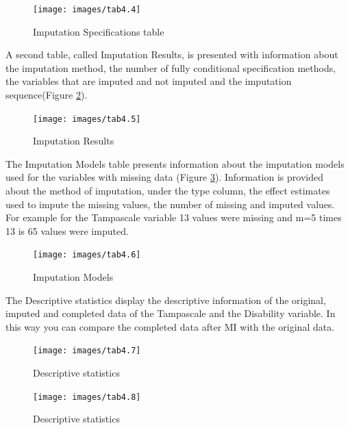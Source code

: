 \documentclass[
]{book}
\begin{document}
\begin{figure}

{\centering \texttt{[image: images/tab4.4]} 

}

\caption{Imputation Specifications table}\label{fig:tab4-4}
\end{figure}

A second table, called Imputation Results, is presented with information about the imputation method, the number of fully conditional specification methods, the variables that are imputed and not imputed and the imputation sequence(Figure \ref{fig:tab4-5}).

\begin{figure}

{\centering \texttt{[image: images/tab4.5]} 

}

\caption{Imputation Results}\label{fig:tab4-5}
\end{figure}

The Imputation Models table presents information about the imputation models used for the variables with missing data (Figure \ref{fig:tab4-6}). Information is provided about the method of imputation, under the type column, the effect estimates used to impute the missing values, the number of missing and imputed values. For example for the Tampascale variable 13 values were missing and m=5 times 13 is 65 values were imputed.

\begin{figure}

{\centering \texttt{[image: images/tab4.6]} 

}

\caption{Imputation Models}\label{fig:tab4-6}
\end{figure}

The Descriptive statistics display the descriptive information of the original, imputed and completed data of the Tampascale and the Disability variable. In this way you can compare the completed data after MI with the original data.

\begin{figure}

{\centering \texttt{[image: images/tab4.7]} 

}

\caption{Descriptive statistics}\label{fig:tab4-7-1}
\end{figure}
\begin{figure}

{\centering \texttt{[image: images/tab4.8]} 

}

\caption{Descriptive statistics}\label{fig:tab4-7-2}
\end{figure}
\end{document}
